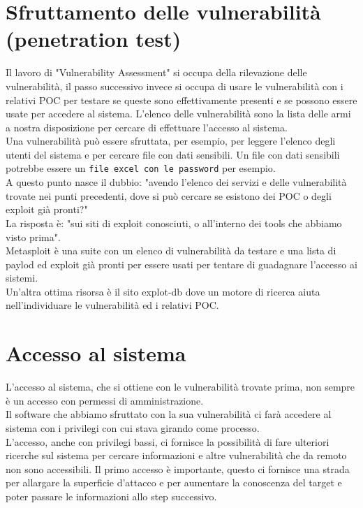 \documentclass[a4paper,12pt]{article}
\begin{document}
\section{  Sfruttamento delle vulnerabilità (penetration test) }

Il lavoro di "Vulnerability Assessment" si occupa della rilevazione delle vulnerabilità, il passo successivo invece si occupa di usare le vulnerabilità con i relativi POC per testare se queste sono effettivamente presenti e se possono essere usate per accedere al sistema. L'elenco delle vulnerabilità sono la lista delle armi a nostra disposizione per cercare di effettuare l'accesso al sistema.\\ 
Una vulnerabilità può essere sfruttata, per esempio, per leggere l'elenco degli utenti del sistema e per cercare file con dati sensibili. Un file con dati sensibili potrebbe essere un \texttt{file excel con le password} per esempio. \\ 
A questo punto nasce il dubbio: "avendo l'elenco dei servizi e delle vulnerabilità trovate nei punti precedenti, dove si può cercare se esistono dei POC o degli exploit già pronti?" \\
La risposta è: "sui siti di exploit conosciuti, o all'interno dei tools che abbiamo visto prima". \\ Metasploit\cite{metasploit} è una suite con un elenco di vulnerabilità da testare e una lista di  paylod ed exploit già pronti per essere usati per tentare di guadagnare l'accesso ai sistemi. \\
Un'altra ottima risorsa è il sito explot-db\cite{explot-db} dove un motore di ricerca aiuta nell'individuare le vulnerabilità ed i relativi POC.

\section{ Accesso al sistema }

L'accesso al sistema, che si ottiene con le vulnerabilità trovate prima, non sempre è un accesso con permessi di amministrazione.\\
Il software che abbiamo sfruttato con la sua vulnerabilità ci farà accedere al sistema con i privilegi con cui stava girando come processo.\\
L'accesso, anche con privilegi bassi, ci fornisce la possibilità di fare ulteriori ricerche sul sistema per cercare informazioni e altre vulnerabilità che da remoto non sono accessibili.
Il primo accesso è importante, questo ci fornisce una strada per allargare la superficie d'attacco e per aumentare la conoscenza del target e poter passare le informazioni allo step successivo.
\end{document}
